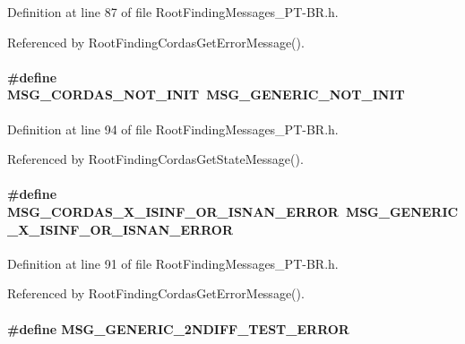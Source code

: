 Definition at line 87 of file RootFindingMessages\_\-PT-BR.h.

Referenced by RootFindingCordasGetErrorMessage().\hypertarget{group____messages_gaad95696ca51302bb4eeda73e504af28}{
\paragraph[MSG\_\-CORDAS\_\-NOT\_\-INIT]{\setlength{\rightskip}{0pt plus 5cm}\#define MSG\_\-CORDAS\_\-NOT\_\-INIT~MSG\_\-GENERIC\_\-NOT\_\-INIT}\hfill}
\label{group____messages_gaad95696ca51302bb4eeda73e504af28}




Definition at line 94 of file RootFindingMessages\_\-PT-BR.h.

Referenced by RootFindingCordasGetStateMessage().\hypertarget{group____messages_g3833ee2af65442ebe52a0b8894d0ffba}{
\paragraph[MSG\_\-CORDAS\_\-X\_\-ISINF\_\-OR\_\-ISNAN\_\-ERROR]{\setlength{\rightskip}{0pt plus 5cm}\#define MSG\_\-CORDAS\_\-X\_\-ISINF\_\-OR\_\-ISNAN\_\-ERROR~MSG\_\-GENERIC\_\-X\_\-ISINF\_\-OR\_\-ISNAN\_\-ERROR}\hfill}
\label{group____messages_g3833ee2af65442ebe52a0b8894d0ffba}




Definition at line 91 of file RootFindingMessages\_\-PT-BR.h.

Referenced by RootFindingCordasGetErrorMessage().\hypertarget{group____messages_gce1123edca28cb0b02531869093e7214}{
\paragraph[MSG\_\-GENERIC\_\-2NDIFF\_\-TEST\_\-ERROR]{\setlength{\rightskip}{0pt plus 5cm}\#define MSG\_\-GENERIC\_\-2NDIFF\_\-TEST\_\-ERROR}\hfill}
\label{group____messages_gce1123edca28cb0b02531869093e7214}


